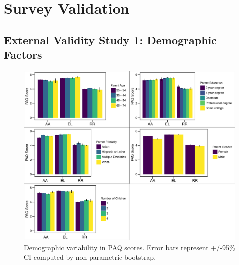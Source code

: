 \documentclass[man]{apa6}
\theoremstyle{definition}
\theoremstyle{definition}
\theoremstyle{definition}
\theoremstyle{remark}
\begin{document}
\section{Survey Validation}\label{survey-validation}

\subsection{External Validity Study 1: Demographic
Factors}\label{external-validity-study-1-demographic-factors}

\begin{figure}
\centering
\includegraphics{PAQ_paper_files/figure-latex/demographics-1.pdf}
\caption{\label{fig:demographics}Demographic variability in PAQ scores.
Error bars represent +/-95\% CI computed by non-parametric bootstrap.}
\end{figure}
\end{document}
